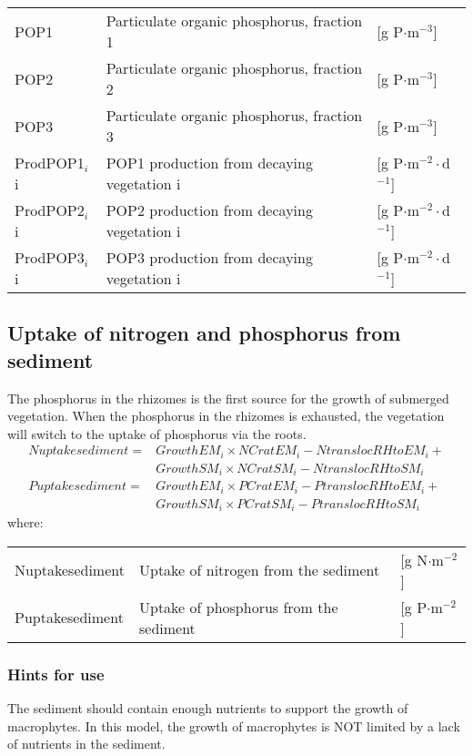 \begin{tabular}{lll}
POP1           & Particulate organic phosphorus, fraction 1     & [g P$\cdot$m$^{-3}$]                \\
POP2           & Particulate organic phosphorus, fraction 2     & [g P$\cdot$m$^{-3}$]                \\
POP3           & Particulate organic phosphorus, fraction 3     & [g P$\cdot$m$^{-3}$]                \\
ProdPOP1$_i$i  & POP1 production from decaying vegetation i     & [g P$\cdot$m$^{-2}\cdot$d$^{-1}$]   \\
ProdPOP2$_i$i  & POP2 production from decaying vegetation i     & [g P$\cdot$m$^{-2}\cdot$d$^{-1}$]   \\
ProdPOP3$_i$i  & POP3 production from decaying vegetation i     & [g P$\cdot$m$^{-2}\cdot$d$^{-1}$]   \\
\end{tabular}

\subsection{Uptake of nitrogen and phosphorus from sediment}
\label{UptakeSediment}
The phosphorus in the rhizomes is the first source for the growth of submerged vegetation. When the
phosphorus in the rhizomes is exhausted, the vegetation will switch to the uptake of phosphorus via
the roots.
%
\begin{align}
\nonumber Nuptakesediment = &GrowthEM_i \times NCratEM_i - NtranslocRHtoEM_i + \\
\nonumber                   &GrowthSM_i \times NCratSM_i - NtranslocRHtoSM_i   \\
\nonumber Puptakesediment = &GrowthEM_i \times PCratEM_i - PtranslocRHtoEM_i + \\
                            &GrowthSM_i \times PCratSM_i - PtranslocRHtoSM_i
\end{align}
%
where:

\begin{tabular}{lll}
Nuptakesediment       & Uptake of nitrogen from the sediment           & [g N$\cdot$m$^{-2}$] \\
Puptakesediment       & Uptake of phosphorus from the sediment         & [g P$\cdot$m$^{-2}$] \\
\end{tabular}

\subsubsection{Hints for use}
The sediment should contain enough nutrients to support the growth of macrophytes. In this model,
the growth of macrophytes is NOT limited by a lack of nutrients in the sediment.

